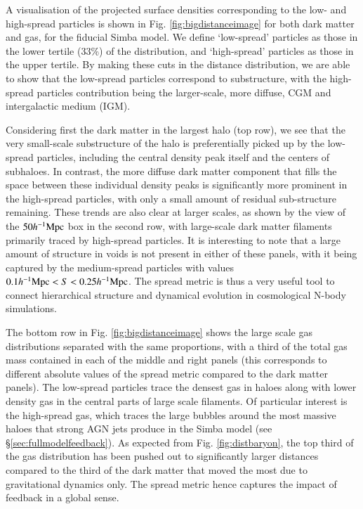\documentclass[fleqn,usenatbib]{mnras}
\newcommand{\hmpc}{h^{-1}{\rm Mpc}}
\newcommand{\simba}{{\sc Simba}}
\begin{document}
A visualisation of the projected surface densities corresponding to the low-
and high-spread particles is shown in Fig. \ref{fig:bigdistanceimage} for
both dark matter and gas, for the fiducial \simba{} model. We define
`low-spread' particles as those in the lower tertile (33\%) of the
distribution, and `high-spread' particles as those in the upper tertile. By
making these cuts in the distance distribution, we are able to show that the
low-spread particles correspond to substructure, with the high-spread
particles contribution being the larger-scale, more diffuse, CGM and
intergalactic medium (IGM).


Considering first the dark matter in the largest halo (top row), we see that
the very small-scale substructure of the halo is preferentially picked up by
the low-spread particles, including the central density peak itself and the
centers of subhaloes. In contrast, the more diffuse dark matter component that
fills the space between these individual density peaks is significantly more
prominent in the high-spread particles, with only a small amount of residual
sub-structure remaining. These trends are also clear at larger scales, as
shown by the view of the $50\hmpc{}$ box in the second row, with large-scale
dark matter filaments primarily traced by high-spread particles. It is
interesting to note that a large amount of structure in voids is not present
in either of these panels, with it being captured by the medium-spread
particles with values $0.1\hmpc{} < S < 0.25 \hmpc{}$. The spread
metric is thus a very useful tool to connect hierarchical structure and
dynamical evolution in cosmological N-body simulations.

The bottom row in Fig. \ref{fig:bigdistanceimage} shows the large scale gas
distributions separated with the same proportions, with a third of the total
gas mass contained in each of the middle and right panels (this corresponds
to different absolute values of the spread metric compared to the dark matter
panels). The low-spread particles trace the densest gas in haloes along with
lower density gas in the central parts of large scale filaments. Of
particular interest is the high-spread gas, which traces the large bubbles
around the most massive haloes that strong AGN jets produce in the \simba{}
model (see \S \ref{sec:fullmodelfeedback}). As expected from Fig.
\ref{fig:distbaryon}, the top third of the gas distribution has been pushed out
to significantly larger distances compared to the third of the dark matter that
moved the most due to gravitational dynamics only. The spread metric hence 
captures the impact of feedback in a global sense.
\end{document}
